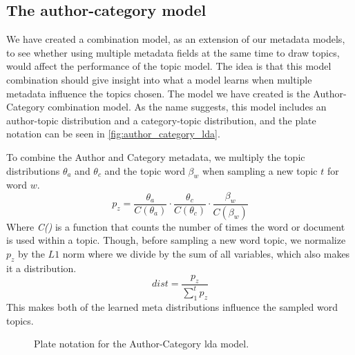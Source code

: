 \subsection{The author-category model}\label{sec:combination}
We have created a combination model, as an extension of our metadata models, to see whether using multiple metadata fields at the same time to draw topics, would affect the performance of the topic model.
The idea is that this model combination should give insight into what a model learns when multiple metadata influence the topics chosen.
The model we have created is the Author-Category combination model.
As the name suggests, this model includes an author-topic distribution and a category-topic distribution, and the plate notation can be seen in \autoref{fig:author_category_lda}.

To combine the Author and Category metadata, we multiply the topic distributions $\theta_a$ and $\theta_c$ and the topic word $\beta_w$ when sampling a new topic $t$ for word $w$.
\begin{equation}
	p_z = \frac{\theta_a}{C(\theta_a)} \cdot \frac{\theta_c}{C(\theta_c)} \cdot \frac{\beta_w}{C(\beta_w)}
\end{equation}
Where \emph{C()} is a function that counts the number of times the word or document is used within a topic.
Though, before sampling a new word topic, we normalize $p_z$ by the $L1$ norm where we divide by the sum of all variables, which also makes it a distribution. 
\begin{equation}
	dist = \frac{p_z}{\sum_{1}^{t} p_z}
\end{equation}
This makes both of the learned meta distributions influence the sampled word topics.

\begin{figure*}[ht]
	\centering
	\resizebox{.3\textwidth}{!}{%
		
	}
	\caption{Plate notation for the Author-Category \gls{lda} model.}
	\label{fig:author_category_lda}
\end{figure*}





